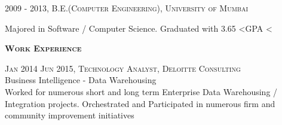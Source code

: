\documentclass[letterpaper,12pt,final]{memoir}
\newcommand{\SmallSep}{\vspace{0.5em}}
\newcommand{\CVSection}[1]
	{\Large\textbf{\textsc{{#1}}}\par
	\SmallSep\normalsize\normalfont}
\newcommand{\CVItem}[1]
	{\textsc{\color{Black} #1}}
\begin{document}
\CVItem{2009 - 2013, B.E.(Computer Engineering), University of \allowbreak  Mumbai}\\
 \begin{footnotesize}
 	Majored in Software / Computer Science. Graduated with 3.65 \textless \space GPA \textless {} \space
 \end{footnotesize}
\SmallSep

\CVSection{Work Experience}
\CVItem{Jan 2014 \textendash \space Jun 2015, Technology Analyst, Deloitte Consulting}\\
\SmallSep
Business Intelligence - Data Warehousing\\
{\footnotesize Worked for numerous short and long term Enterprise Data Warehousing / Integration projects. Orchestrated and Participated in numerous firm and community improvement initiatives}
\SmallSep
\end{document}
